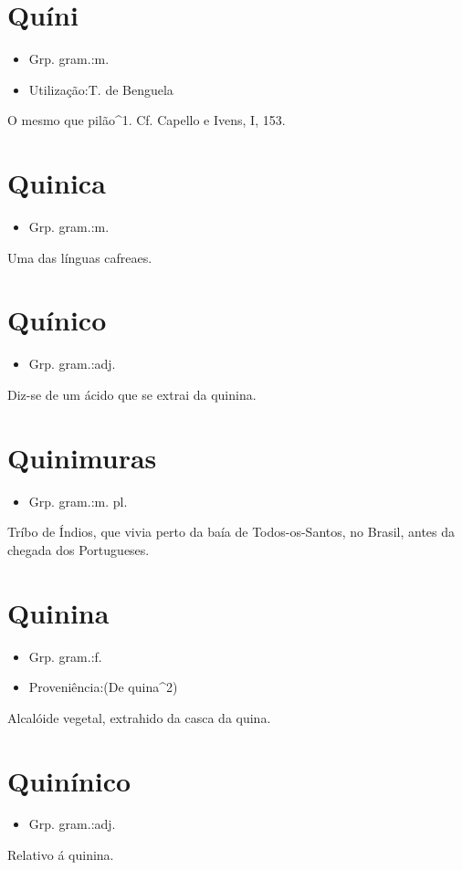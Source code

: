 \section{Quíni}
\begin{itemize}
\item {Grp. gram.:m.}
\end{itemize}
\begin{itemize}
\item {Utilização:T. de Benguela}
\end{itemize}
O mesmo que \textunderscore pilão\textunderscore ^1. Cf. Capello e Ivens, I, 153.
\section{Quinica}
\begin{itemize}
\item {Grp. gram.:m.}
\end{itemize}
Uma das línguas cafreaes.
\section{Quínico}
\begin{itemize}
\item {Grp. gram.:adj.}
\end{itemize}
Diz-se de um ácido que se extrai da quinina.
\section{Quinimuras}
\begin{itemize}
\item {Grp. gram.:m. pl.}
\end{itemize}
Tríbo de Índios, que vivia perto da baía de Todos-os-Santos, no Brasil, antes da chegada dos Portugueses.
\section{Quinina}
\begin{itemize}
\item {Grp. gram.:f.}
\end{itemize}
\begin{itemize}
\item {Proveniência:(De \textunderscore quina\textunderscore ^2)}
\end{itemize}
Alcalóide vegetal, extrahido da casca da quina.
\section{Quinínico}
\begin{itemize}
\item {Grp. gram.:adj.}
\end{itemize}
Relativo á quinina.
